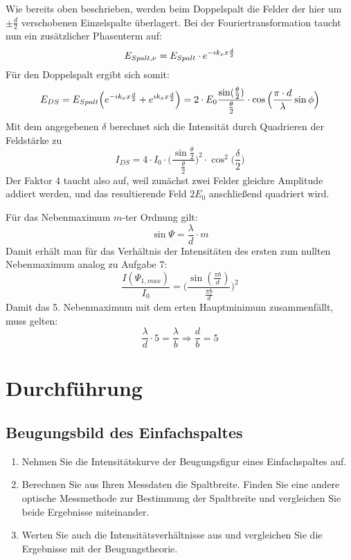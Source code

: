 \begin{enumerate}
		\subitem Wie bereits oben beschrieben, werden beim Doppelspalt die Felder der hier um $\pm\frac{d}{2}$ verschobenen Einzelspalte überlagert. Bei der Fouriertransformation taucht nun ein zusätzlicher Phasenterm auf:
		\begin{displaymath}
			E_{Spalt,\nu}=E_{Spalt}\cdot e^{-\imath k_xx\frac{d}{2}}
		\end{displaymath}
		Für den Doppelspalt ergibt sich somit:
		\begin{displaymath}
			E_{DS}=E_{Spalt}\Big(e^{-\imath k_xx\frac{d}{2}}+e^{\imath k_xx\frac{d}{2}}\Big)=2\cdot E_0\frac{\sin(\frac{\theta}{2})}{\frac{\theta}{2}}\cdot\cos\Big(\frac{\pi\cdot d}{\lambda}\sin\phi\Big)
		\end{displaymath}
		Mit dem angegebenen $\delta$ berechnet sich die Intensität durch Quadrieren der Feldstärke zu
		\begin{displaymath}
			I_{DS}=4\cdot I_0\cdot\Big(\frac{\sin\frac{\theta}{2}}{\frac{\theta}{2}}\Big)^2\cdot\cos^2\Big(\frac{\delta}{2}\Big)
		\end{displaymath}
		Der Faktor $4$ taucht also auf, weil zunächst zwei Felder gleichre Amplitude addiert werden, und das resultierende Feld $2E_0$ anschließend quadriert wird.
		
		Für das Nebenmaximum $m$-ter Ordnung gilt:
		\begin{displaymath}
			\sin\Psi=\frac{\lambda}{d}\cdot m
		\end{displaymath}
		Damit erhält man für das Verhältnis der Intensitäten des ersten zum nullten Nebenmaximum analog zu Aufgabe 7:
		\begin{displaymath}
			\frac{I(\Psi_{1,max})}{I_0}=\Bigg(\frac{\sin(\frac{\pi b}{d})}{\frac{\pi b}{d}}\Bigg)^2
		\end{displaymath}
		Damit das 5. Nebenmaximum mit dem erten Hauptminimum zusammenfällt, muss gelten:
		\begin{displaymath}
			\frac{\lambda}{d}\cdot 5=\frac{\lambda}{b}\Rightarrow\frac{d}{b}=5
		\end{displaymath}
\end{enumerate}
\section{Durchführung}
\subsection{Beugungsbild des Einfachspaltes}
\begin{enumerate}[label=\alph*)]
	\item Nehmen Sie die Intensitätskurve der Beugungsfigur eines Einfachspaltes auf.
	\item Berechnen Sie aus Ihren Messdaten die Spaltbreite. Finden Sie eine andere optische Messmethode zur Bestimmung der Spaltbreite und vergleichen Sie beide Ergebnisse miteinander.
	\item Werten Sie auch die Intensitätsverhältnisse aus und vergleichen Sie die Ergebnisse mit der Beugungstheorie.
\end{enumerate}
